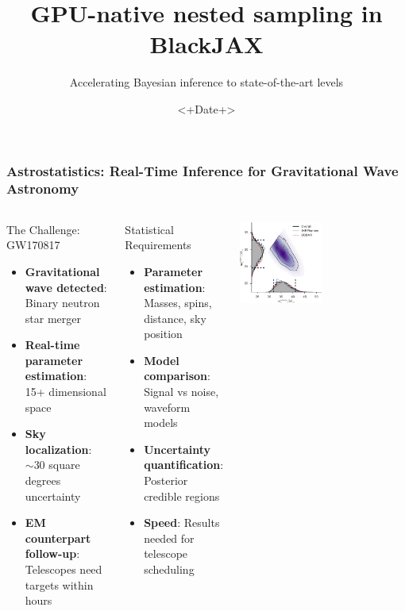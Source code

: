 \documentclass[aspectratio=169]{beamer}
\title{GPU-native nested sampling in BlackJAX}
\subtitle{Accelerating Bayesian inference to state-of-the-art levels}
\date{<+Date+>}
\begin{document}
\begin{frame}
    \titlepage
\end{frame}

\begin{frame}
    \frametitle{Astrostatistics: Real-Time Inference for Gravitational Wave Astronomy}
    \begin{columns}
        \begin{block}{The Challenge: GW170817}
            \begin{itemize}
                \item \textbf{Gravitational wave detected}: Binary neutron star merger
                \item \textbf{Real-time parameter estimation}: 15+ dimensional space
                \item \textbf{Sky localization}: $\sim 30$ square degrees uncertainty
                \item \textbf{EM counterpart follow-up}: Telescopes need targets within hours
            \end{itemize}
        \end{block}
        \begin{block}{Statistical Requirements}
            \begin{itemize}
                \item \textbf{Parameter estimation}: Masses, spins, distance, sky position
                \item \textbf{Model comparison}: Signal vs noise, waveform models
                \item \textbf{Uncertainty quantification}: Posterior credible regions
                \item \textbf{Speed}: Results needed for telescope scheduling
            \end{itemize}
        \end{block}
        \includegraphics[width=0.49\textwidth]{figures/ligo_m1_m2}

\end{columns}
\end{frame}
\end{document}
